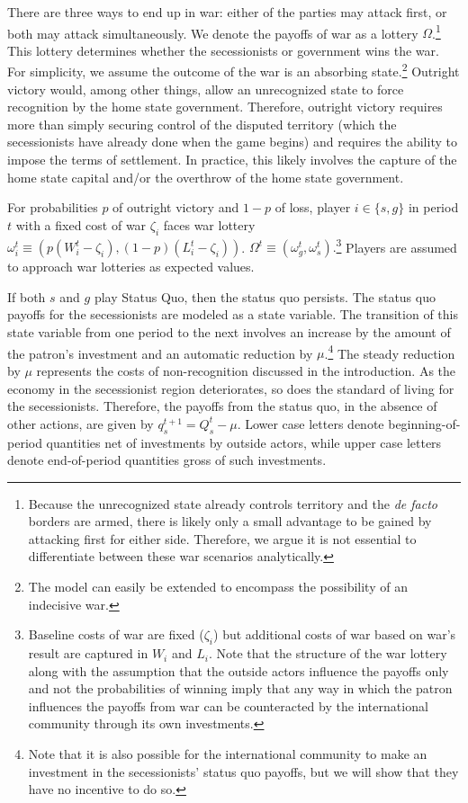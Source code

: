 \documentclass[11pt,letterpaper, notitlepage]{article}
\begin{document}
There are three ways to end up in war: either of the parties may attack first, or both may attack simultaneously. We denote the payoffs of war as a lottery $\Omega$.\footnote{Because the unrecognized state already controls territory and the \emph{de facto} borders are armed, there is likely only a small advantage to be gained by attacking first for either side. Therefore, we argue it is not essential to differentiate between these war scenarios analytically.} This lottery determines whether the secessionists or government wins the war. For simplicity, we assume the outcome of the war is an absorbing state.\footnote{The model can easily be extended to encompass the possibility of an indecisive war.} Outright victory would, among other things, allow an unrecognized state to force recognition by the home state government. Therefore, outright victory requires more than simply securing control of the disputed territory (which the secessionists have already done when the game begins) and requires the ability to impose the terms of settlement. In practice, this likely involves the capture of the home state capital and/or the overthrow of the home state government.

For probabilities $p$ of outright victory and $1-p$ of loss, player $i \in \{s, g\}$ in period $t$ with a fixed cost of war $\zeta_i$ faces war lottery $\omega_i^t \equiv (p (W_i^t-\zeta_i), \left(1-p\right)( L_i^t-\zeta_i))$. $\Omega^t \equiv (\omega_g^t, \omega_s^t).$\footnote{Baseline costs of war are fixed ($\zeta_i$) but additional costs of war based on war's result are captured in $W_i$ and $L_i$. Note that the structure of the war lottery along with the assumption that the outside actors influence the payoffs only and not the probabilities of winning imply that any way in which the patron influences the payoffs from war can be counteracted by the international community through its own investments.} Players are assumed to approach war lotteries as expected values.

If both $s$ and $g$ play Status Quo, then the status quo persists. The status quo payoffs for the secessionists are modeled as a state variable. The transition of this state variable from one period to the next involves an increase by the amount of the patron's investment and an automatic reduction by $\mu$.\footnote{Note that it is also possible for the international community to make an investment in the secessionists' status quo payoffs, but we will show that they have no incentive to do so.} The steady reduction by $\mu$ represents the costs of non-recognition discussed in the introduction. As the economy in the secessionist region deteriorates, so does the standard of living for the secessionists. Therefore, the payoffs from the status quo, in the absence of other actions, are given by $q_s^{t+1} = Q_s^t - \mu$. Lower case letters denote beginning-of-period quantities net of investments by outside actors, while upper case letters denote end-of-period quantities gross of such investments.
\end{document}
